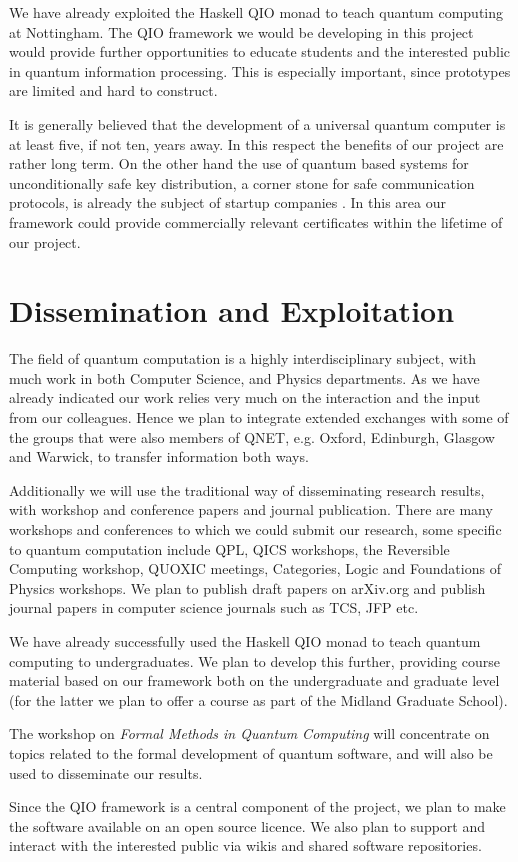 \documentclass[a4paper]{article}
\begin{document}
We have already exploited the Haskell QIO monad to teach quantum
computing at Nottingham. The QIO framework we would be developing in
this project would provide further opportunities to educate students
and the interested public in quantum information processing. This is
especially important, since prototypes are limited and hard to
construct. 

It is generally believed that the development of a universal quantum
computer is at least five, if not ten, years away. In this respect the
benefits of our project are rather long term. On the other hand the
use of quantum based systems for unconditionally safe key
distribution, a corner stone for safe communication protocols, is
already the subject of startup companies . 
In this area our framework could provide commercially
relevant certificates within the lifetime of our project.

\section{Dissemination and Exploitation}

The field of quantum computation is a highly interdisciplinary
subject, with much work in both Computer Science, and Physics
departments. As we have already indicated our work relies very much on
the interaction and the input from our colleagues. Hence we plan to
integrate extended exchanges with 
some of the groups that were also
members of QNET, e.g. Oxford, Edinburgh, Glasgow and Warwick,
to transfer information both
ways. 

Additionally we will use the traditional way of disseminating
research results, with workshop and conference papers and journal
publication. There are many workshops and conferences to which we
could submit our research, some specific to quantum computation
include QPL, QICS workshops, the Reversible
Computing workshop, QUOXIC meetings, Categories, Logic and Foundations
of Physics workshops. We plan to publish draft papers on arXiv.org
and publish journal papers in computer science journals such as
TCS, JFP etc. 

We have already successfully used the Haskell QIO monad to teach
quantum computing to undergraduates. We plan to develop this further,
providing course material based on our framework both on the
undergraduate and graduate level (for the latter we plan to offer a
course as part of the Midland Graduate School).

The workshop on \emph{Formal Methods in Quantum Computing} will 
concentrate on topics related to the formal development of quantum
software, and will also be used to disseminate our results. 

Since the QIO framework is a central component of the project, we plan
to make the software available on an open source licence.  We also
plan to support and interact with the interested public via wikis and
shared software repositories.

{\small 
{}
}

% 
%  
\end{document}
